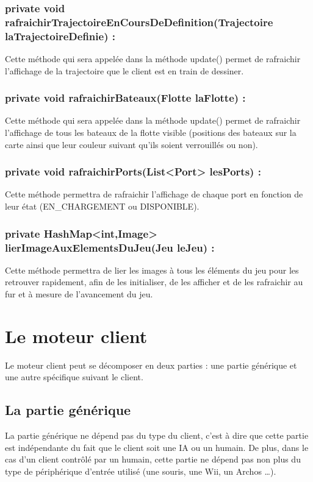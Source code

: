 \subsubsection{private void
  rafraichirTrajectoireEnCoursDeDefinition(Trajectoire
  laTrajectoireDefinie) :}Cette méthode qui sera appelée dans la
méthode update() permet de rafraichir l'affichage de la trajectoire
que le client est en train de dessiner.
\subsubsection{private void rafraichirBateaux(Flotte laFlotte) :}Cette méthode qui sera appelée dans la
méthode update() permet de rafraichir l'affichage de tous les bateaux
de la flotte visible (positions des bateaux sur la carte ainsi que leur couleur suivant qu'ils soient verrouillés ou non).
\subsubsection{private void rafraichirPorts(List<Port> lesPorts)
  :}Cette méthode permettra de rafraichir l'affichage de
chaque port en fonction de leur état (EN\_CHARGEMENT ou DISPONIBLE). 
\subsubsection{private HashMap<int,Image> lierImageAuxElementsDuJeu(Jeu
  leJeu) :}Cette méthode permettra de lier les images à tous les
éléments du jeu pour les retrouver rapidement, afin de les initialiser,
de les afficher et de les rafraichir au fur et à mesure de
l'avancement du jeu.

\section{Le moteur client}
Le moteur client peut se décomposer en deux parties : une partie générique et une autre spécifique suivant le client. \\

\subsection{La partie générique}
La partie générique ne dépend pas du type du client, c'est à dire que cette partie est indépendante du fait que le client soit une IA ou un humain. De plus, dans le cas d'un client contrôlé par un humain, cette partie ne dépend pas non plus du type de périphérique d'entrée utilisé (une souris, une Wii, un Archos \dots{}). \\

